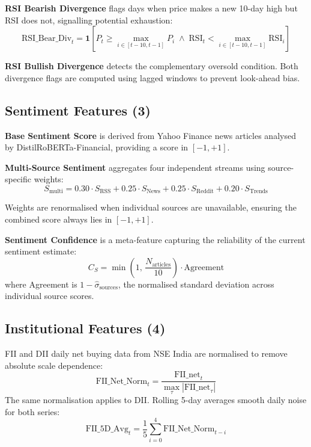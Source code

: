 \documentclass[10pt,a4paper,twoside]{article}
\begin{document}
\textbf{RSI Bearish Divergence} flags days when price makes a new 10-day high
but RSI does not, signalling potential exhaustion:
\begin{equation}
  \text{RSI\_Bear\_Div}_t = \mathbf{1}\!\left[P_t \geq \max_{i \in [t-10,t-1]} P_i
  \;\wedge\; \text{RSI}_t < \max_{i \in [t-10,t-1]} \text{RSI}_i\right]
\end{equation}

\textbf{RSI Bullish Divergence} detects the complementary oversold condition.
Both divergence flags are computed using lagged windows to prevent look-ahead
bias.

\subsection{Sentiment Features (3)}

\textbf{Base Sentiment Score} is derived from Yahoo Finance news articles
analysed by DistilRoBERTa-Financial, providing a score in $[-1, +1]$.

\textbf{Multi-Source Sentiment} aggregates four independent streams using
source-specific weights:
\begin{equation}
  S_{\text{multi}} = 0.30 \cdot S_{\text{RSS}} + 0.25 \cdot S_{\text{News}}
                   + 0.25 \cdot S_{\text{Reddit}} + 0.20 \cdot S_{\text{Trends}}
\end{equation}

Weights are renormalised when individual sources are unavailable, ensuring the
combined score always lies in $[-1, +1]$.

\textbf{Sentiment Confidence} is a meta-feature capturing the reliability of
the current sentiment estimate:
\begin{equation}
  C_S = \min\!\left(1,\, \frac{N_{\text{articles}}}{10}\right)
        \cdot \text{Agreement}
\end{equation}
where Agreement is $1 - \hat{\sigma}_{\text{sources}}$, the normalised standard
deviation across individual source scores.

\subsection{Institutional Features (4)}

FII and DII daily net buying data from NSE India are normalised to remove
absolute scale dependence:
\begin{equation}
  \text{FII\_Net\_Norm}_t = \frac{\text{FII\_net}_t}{\max_\tau |\text{FII\_net}_\tau|}
\end{equation}
The same normalisation applies to DII. Rolling 5-day averages smooth daily
noise for both series:
\begin{equation}
  \text{FII\_5D\_Avg}_t = \frac{1}{5}\sum_{i=0}^{4}\text{FII\_Net\_Norm}_{t-i}
\end{equation}
\end{document}
